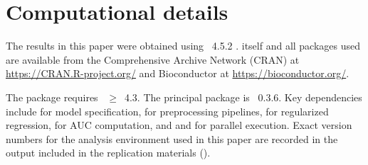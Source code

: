 \documentclass[article,shortnames]{jss}
\begin{document}
\section*{Computational details}

The results in this paper were obtained using
~4.5.2 \citep{R}.  itself
and all packages used are available from the Comprehensive
 Archive Network (CRAN) at
\url{https://CRAN.R-project.org/} and Bioconductor at
\url{https://bioconductor.org/}.

The package requires ~$\geq$~4.3.
The principal package is ~0.3.6. Key dependencies include
 for model specification,
 for preprocessing pipelines,
 for regularized regression,
 for AUC computation,
and  and  for parallel
execution. Exact version numbers for the analysis environment used in this
paper are recorded in the  output included in the
replication materials ().


\end{document}
